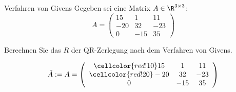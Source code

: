 \begin{example}{Verfahren von Givens}
    Gegeben sei eine Matrix $A \in \R^{3 \times 3}$:
    \[
        A =
        \left(
        \begin{array}{cccc}
                15  & 1   & 11  \\ 
                -20 & 32  & -23 \\ 
                0   & -15 & 35
            \end{array}
        \right)
    \]
    
    Berechnen Sie das $R$ der QR-Zerlegung nach dem Verfahren von Givens.
    
    \exampleseparator
    
    \footnotesize
    \[
        \tilde{A} := A =
        \left(
        \begin{array}{cccc}
                \cellcolor{red!10} 15  & 1   & 11  \\ 
                \cellcolor{red!20} -20 & 32  & -23 \\ 
                0                      & -15 & 35
            \end{array}
        \right)
    \]
    

\end{example}
